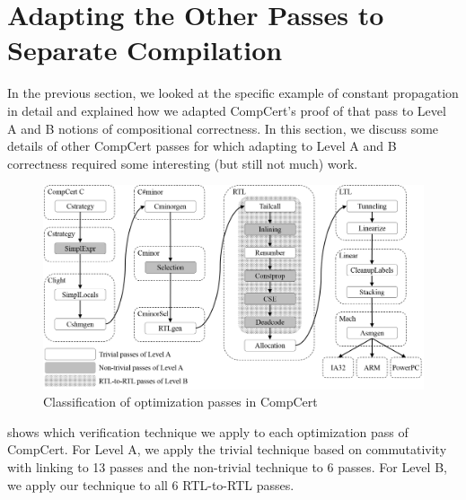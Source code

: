 \section{Adapting the Other Passes to Separate Compilation}

In the previous section, we looked at the specific example of constant propagation in detail and
explained how we adapted CompCert's proof of that pass to Level A and B notions of compositional
correctness.  In this section, we discuss some details of other CompCert passes for which adapting
to Level A and B correctness required some interesting (but still not much) work.

\begin{figure}[t]
\includegraphics[width=\textwidth]{sepcomp-passes.png}
\caption{Classification of optimization passes in CompCert}
\label{fig:sep-comp-passes}
\end{figure}

 shows which verification technique we apply to each optimization
pass of CompCert.  For Level A, we apply the trivial technique based on commutativity with linking
to 13 passes and the non-trivial technique to 6 passes.  For Level B, we apply our technique to all
6 RTL-to-RTL passes.




